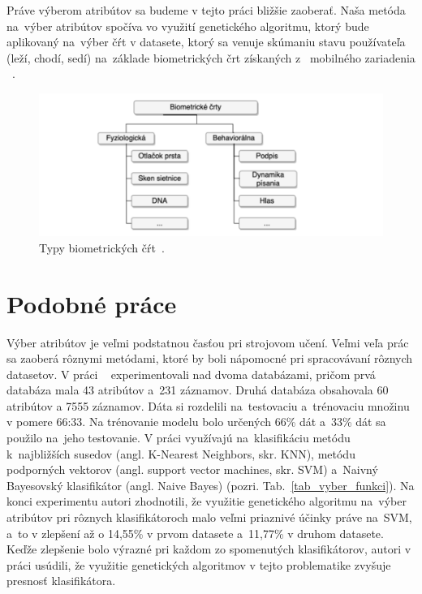 \documentclass[runningheads]{llncs}
\begin{document}
Práve výberom atribútov sa 
budeme v tejto práci bližšie zaoberať. Naša metóda na~výber atribútov spočíva vo využití 
genetického algoritmu, ktorý bude aplikovaný na~výber čŕt v datasete, ktorý sa venuje skúmaniu
stavu používateľa (leží, chodí, sedí) na~základe biometrických črt získaných z~
mobilného zariadenia ~\cite{ref_dataset_anguita,ref_dataset}.


\begin{figure}
\includegraphics[width=\textwidth]{image/rozdelenie_biometrie.png}
\caption{Typy biometrických čŕt~\cite{ref_teh}.} \label{fig_rozdelenie_biometrie}
\end{figure}

\section{Podobné práce}

Výber atribútov je veľmi podstatnou časťou pri strojovom učení. Veľmi veľa prác sa 
zaoberá rôznymi metódami, ktoré by boli nápomocné pri spracovávaní rôznych datasetov.
V práci ~\cite{ref_nascimento} experimentovali nad dvoma databázami, pričom 
prvá databáza mala 43 atribútov a~231 záznamov. Druhá databáza obsahovala 60 atribútov 
a 7555 záznamov. Dáta si rozdelili na~testovaciu a~trénovaciu množinu v pomere 66:33. 
Na trénovanie modelu bolo určených 66\% dát a~33\% dát sa použilo na~jeho testovanie. 
V práci využívajú na~klasifikáciu metódu k~najbližších susedov (angl. K-Nearest Neighbors, skr. KNN), metódu podporných vektorov (angl. support vector machines, skr. SVM) a~Naivný Bayesovský klasifikátor (angl. Naive Bayes)  
(pozri. Tab.~\ref{tab_vyber_funkci}). Na konci experimentu autori zhodnotili, 
že využitie genetického algoritmu na~výber atribútov pri rôznych klasifikátoroch malo veľmi priaznivé
účinky práve na~SVM, a~to v zlepšení až o 14,55\% v prvom datasete a~11,77\% v druhom datasete.
Keďže zlepšenie bolo výrazné pri každom zo spomenutých klasifikátorov, autori v práci usúdili, že
využitie genetických algoritmov v tejto problematike zvyšuje presnosť klasifikátora.
\end{document}
